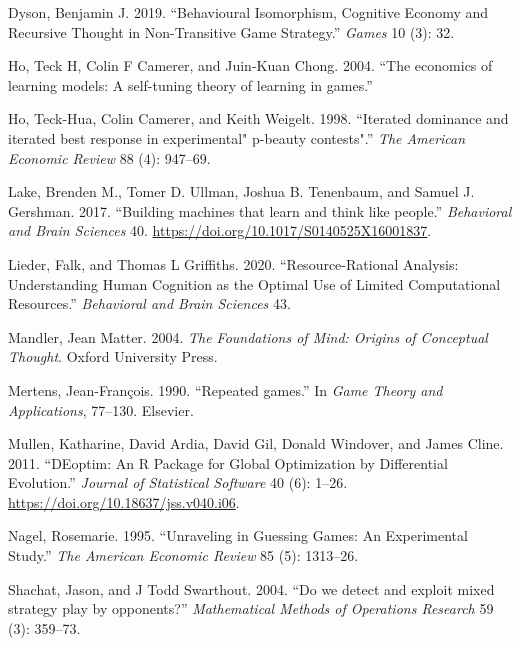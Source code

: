 \documentclass[smallextended]{svjour3}       %
\newlength{\cslhangindent}
\newenvironment{CSLReferences}[2] %
 {%
  \setlength{\parindent}{0pt}
  \ifodd #1 \everypar{\setlength{\hangindent}{\cslhangindent}}\ignorespaces\fi
  \ifnum #2 > 0
  \setlength{\parskip}{#2\baselineskip}
  \fi
 }%
 {}
\begin{document}
\begin{CSLReferences}{1}{0}
\leavevmode{}%
Dyson, Benjamin J. 2019. {``Behavioural Isomorphism, Cognitive Economy
and Recursive Thought in Non-Transitive Game Strategy.''} \emph{Games}
10 (3): 32.

\leavevmode{}%
Ho, Teck H, Colin F Camerer, and Juin-Kuan Chong. 2004. {``{The
economics of learning models: A self-tuning theory of learning in
games}.''}

\leavevmode{}%
Ho, Teck-Hua, Colin Camerer, and Keith Weigelt. 1998. {``{Iterated
dominance and iterated best response in experimental" p-beauty
contests"}.''} \emph{The American Economic Review} 88 (4): 947--69.

\leavevmode{}%
Lake, Brenden M., Tomer D. Ullman, Joshua B. Tenenbaum, and Samuel J.
Gershman. 2017. {``{Building machines that learn and think like
people}.''} \emph{Behavioral and Brain Sciences} 40.
\url{https://doi.org/10.1017/S0140525X16001837}.

\leavevmode{}%
Lieder, Falk, and Thomas L Griffiths. 2020. {``Resource-Rational
Analysis: Understanding Human Cognition as the Optimal Use of Limited
Computational Resources.''} \emph{Behavioral and Brain Sciences} 43.

\leavevmode{}%
Mandler, Jean Matter. 2004. \emph{The Foundations of Mind: Origins of
Conceptual Thought}. Oxford University Press.

\leavevmode{}%
Mertens, Jean-François. 1990. {``{Repeated games}.''} In \emph{Game
Theory and Applications}, 77--130. Elsevier.

\leavevmode{}%
Mullen, Katharine, David Ardia, David Gil, Donald Windover, and James
Cline. 2011. {``{DEoptim}: An {R} Package for Global Optimization by
{D}ifferential {E}volution.''} \emph{Journal of Statistical Software} 40
(6): 1--26. \url{https://doi.org/10.18637/jss.v040.i06}.

\leavevmode{}%
Nagel, Rosemarie. 1995. {``Unraveling in Guessing Games: An Experimental
Study.''} \emph{The American Economic Review} 85 (5): 1313--26.

\leavevmode{}%
Shachat, Jason, and J Todd Swarthout. 2004. {``{Do we detect and exploit
mixed strategy play by opponents?}''} \emph{Mathematical Methods of
Operations Research} 59 (3): 359--73.


\end{CSLReferences}
\end{document}
